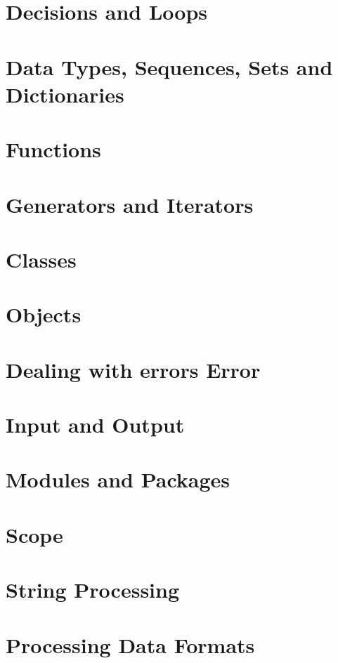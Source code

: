 \documentclass{article}
\begin{document}
\section{Decisions and Loops}
\section{Data Types, Sequences, Sets and Dictionaries}
\section{Functions}
\section{Generators and Iterators}
\section{Classes}
\section{Objects}
\section{Dealing with errors Error}
\section{Input and Output}
\section{Modules and Packages}
\section{Scope}
\section{String Processing}
\section{Processing Data Formats}
\end{document}

